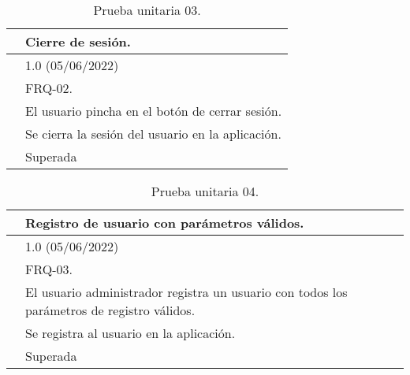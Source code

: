 \begin{table}[H]
\begin{center}
\begin{tabular}{|p{3cm}|p{10cm}|} \hline
\centering {\bf PU-03} & Cierre de sesión.  \\ \hline\hline
\centering {\bf Versión} & 1.0 (05/06/2022) \\ \hline
\centering {\bf Dependencias} & FRQ-02. \\ \hline
\centering {\bf Descripción} &  El usuario pincha en el botón de cerrar sesión. \\ \hline
\centering {\bf Criterio de aceptación} & Se cierra la sesión del usuario en la aplicación. \\ \hline
\centering {\bf Estado} & Superada \\ \hline
\end{tabular}
\caption{Prueba unitaria 03.}
\label{enlacePU3}
\end{center}
\end{table}

\begin{table}[H]
\begin{center}
\begin{tabular}{|p{3cm}|p{10cm}|} \hline
\centering {\bf PU-04} & Registro de usuario con parámetros válidos.  \\ \hline\hline
\centering {\bf Versión} & 1.0 (05/06/2022) \\ \hline
\centering {\bf Dependencias} & FRQ-03. \\ \hline
\centering {\bf Descripción} &  El usuario administrador registra un usuario con todos los parámetros de registro válidos. \\ \hline
\centering {\bf Criterio de aceptación} & Se registra al usuario en la aplicación. \\ \hline
\centering {\bf Estado} & Superada \\ \hline
\end{tabular}
\caption{Prueba unitaria 04.}
\label{enlacePU4}
\end{center}
\end{table}

